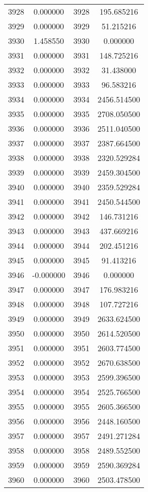 \documentclass[12pt]{article}
\begin{document}
\begin{longtable}{@{}cccc@{}}
3928 & 0.000000 & 3928 & 195.685216 \\
3929 & 0.000000 & 3929 & 51.215216 \\
3930 & 1.458550 & 3930 & 0.000000 \\
3931 & 0.000000 & 3931 & 148.725216 \\
3932 & 0.000000 & 3932 & 31.438000 \\
3933 & 0.000000 & 3933 & 96.583216 \\
3934 & 0.000000 & 3934 & 2456.514500 \\
3935 & 0.000000 & 3935 & 2708.050500 \\
3936 & 0.000000 & 3936 & 2511.040500 \\
3937 & 0.000000 & 3937 & 2387.664500 \\
3938 & 0.000000 & 3938 & 2320.529284 \\
3939 & 0.000000 & 3939 & 2459.304500 \\
3940 & 0.000000 & 3940 & 2359.529284 \\
3941 & 0.000000 & 3941 & 2450.544500 \\
3942 & 0.000000 & 3942 & 146.731216 \\
3943 & 0.000000 & 3943 & 437.669216 \\
3944 & 0.000000 & 3944 & 202.451216 \\
3945 & 0.000000 & 3945 & 91.413216 \\
3946 & -0.000000 & 3946 & 0.000000 \\
3947 & 0.000000 & 3947 & 176.983216 \\
3948 & 0.000000 & 3948 & 107.727216 \\
3949 & 0.000000 & 3949 & 2633.624500 \\
3950 & 0.000000 & 3950 & 2614.520500 \\
3951 & 0.000000 & 3951 & 2603.774500 \\
3952 & 0.000000 & 3952 & 2670.638500 \\
3953 & 0.000000 & 3953 & 2599.396500 \\
3954 & 0.000000 & 3954 & 2525.766500 \\
3955 & 0.000000 & 3955 & 2605.366500 \\
3956 & 0.000000 & 3956 & 2448.160500 \\
3957 & 0.000000 & 3957 & 2491.271284 \\
3958 & 0.000000 & 3958 & 2489.552500 \\
3959 & 0.000000 & 3959 & 2590.369284 \\
3960 & 0.000000 & 3960 & 2503.478500 \\

\end{longtable}
\end{document}
